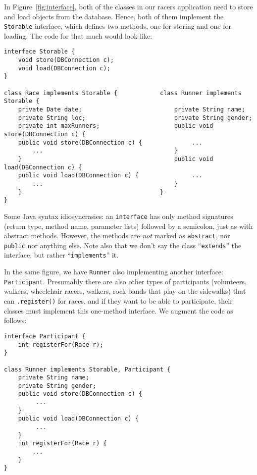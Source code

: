 In Figure~\ref{fig:interface}, both of the classes in our racers 
application need to store and load objects from the database. Hence, both of
them implement the \texttt{Storable} interface, which defines two methods, one
for storing and one for loading. The code for that much would look like:

\begin{Verbatim}[fontsize=\scriptsize,samepage=true,frame=single]
interface Storable {
    void store(DBConnection c);
    void load(DBConnection c);
}

class Race implements Storable {            class Runner implements Storable {                        
    private Date date;                          private String name;
    private String loc;                         private String gender;
    private int maxRunners;                     public void store(DBConnection c) {
    public void store(DBConnection c) {              ...
        ...                                     }
    }                                           public void load(DBConnection c) {
    public void load(DBConnection c) {               ...
        ...                                     }
    }                                       }                                          
}                                            
\end{Verbatim}

Some Java syntax idiosyncrasies: an \texttt{interface} has only method
signatures (return type, method name, parameter lists) followed by a
semicolon, just as with abstract methods. However, the methods are
\textit{not} marked as \texttt{abstract}, nor \texttt{public} nor anything
else. Note also that we don't say the class ``\texttt{extends}'' the interface,
but rather ``\texttt{implements}'' it.

In the same figure, we have \texttt{Runner} also implementing another
interface: \texttt{Participant}. Presumably there are also other types of
participants (volunteers, walkers, wheelchair racers, walkers, rock bands that
play on the sidewalks) that can \texttt{.register()} for races, and if they
want to be able to participate, their classes must implement this one-method
interface. We augment the code as follows:

\begin{Verbatim}[fontsize=\scriptsize,samepage=true,frame=single]
interface Participant {
    int registerFor(Race r);
}

class Runner implements Storable, Participant {                        
    private String name;
    private String gender;
    public void store(DBConnection c) {
         ...
    }
    public void load(DBConnection c) {
         ...
    }
    int registerFor(Race r) {
        ...
    }
}                                            
\end{Verbatim}

